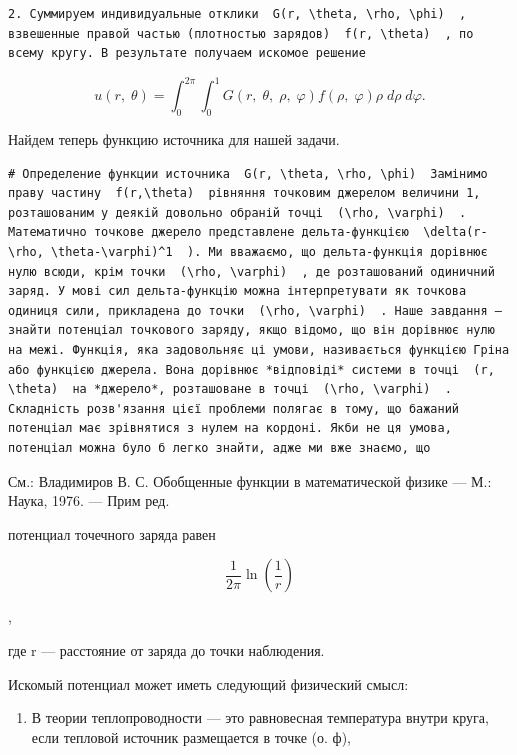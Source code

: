 \documentclass[
  ukrainian,
]{article}
\providecommand{\tightlist}{%
  \setlength{\itemsep}{0pt}\setlength{\parskip}{0pt}}
\begin{document}
\begin{verbatim}
2. Суммируем индивидуальные отклики  G(r, \theta, \rho, \phi)  , взвешенные правой частью (плотностью зарядов)  f(r, \theta)  , по всему кругу. В результате получаем искомое решение
\end{verbatim}

\[
u\left(r,\;\theta\right) = \int_{0}^{2\pi} \int_{0}^{1} G\left(r,\;\theta,\;\rho,\;\varphi\right) f\left(\rho,\;\varphi\right) \rho \; d\rho \; d\varphi.
\]

Найдем теперь функцию источника для нашей задачи.

\begin{verbatim}
# Определение функции источника  G(r, \theta, \rho, \phi)  Замінимо праву частину  f(r,\theta)  рівняння точковим джерелом величини 1, розташованим у деякій довольно обраній точці  (\rho, \varphi)  . Математично точкове джерело представлене дельта-функцією  \delta(r-\rho, \theta-\varphi)^1  ). Ми вважаємо, що дельта-функція дорівнює нулю всюди, крім точки  (\rho, \varphi)  , де розташований одиничний заряд. У мові сил дельта-функцію можна інтерпретувати як точкова одиниця сили, прикладена до точки  (\rho, \varphi)  . Наше завдання — знайти потенціал точкового заряду, якщо відомо, що він дорівнює нулю на межі. Функція, яка задовольняє ці умови, називається функцією Гріна або функцією джерела. Вона дорівнює *відповіді* системи в точці  (r, \theta)  на *джерело*, розташоване в точці  (\rho, \varphi)  . Складність розв'язання цієї проблеми полягає в тому, що бажаний потенціал має зрівнятися з нулем на кордоні. Якби не ця умова, потенціал можна було б легко знайти, адже ми вже знаємо, що
\end{verbatim}

См.: Владимиров В. С. Обобщенные функции в математической физике --- М.:
Наука, 1976. --- Прим ред.

потенциал точечного заряда равен

\[
\frac{1}{2\pi} \ln \left( \frac{1}{r} \right)
\]

,

где r --- расстояние от заряда до точки наблюдения.

Искомый потенциал может иметь следующий физический смысл:

\begin{enumerate}
\def\labelenumi{\arabic{enumi}.}
\tightlist
\item
  В теории теплопроводности --- это равновесная температура внутри
  круга, если тепловой источник размещается в точке (о. ф),
\end{enumerate}
\end{document}
